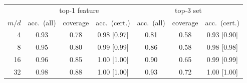 \begin{tabular}{r|ccc|ccc}
\toprule
& \multicolumn{3}{c|}{top-1 feature} & \multicolumn{3}{c}{top-3 set}\\
$m/d$ & acc.\ (all) & coverage & acc.\ (cert.) & acc.\ (all) & coverage & acc.\ (cert.)\\
\midrule
4 & 0.93 & 0.78 & 0.98 [0.97] & 0.81 & 0.58 & 0.93 [0.90]\\
8 & 0.95 & 0.80 & 0.99 [0.99] & 0.86 & 0.58 & 0.98 [0.98]\\
16 & 0.96 & 0.85 & 1.00 [1.00] & 0.90 & 0.65 & 0.99 [0.99]\\
32 & 0.98 & 0.88 & 1.00 [1.00] & 0.93 & 0.72 & 1.00 [1.00]\\
\bottomrule
\end{tabular}
